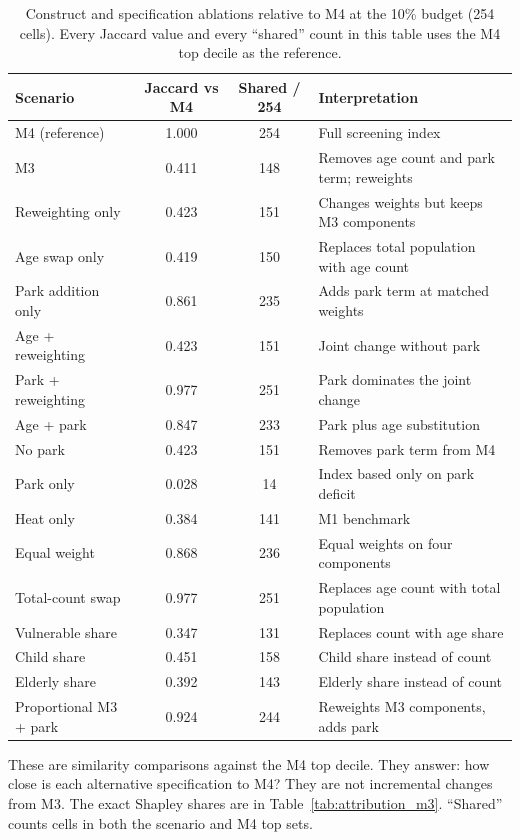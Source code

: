 \begin{table}[H]
\centering
\small
\caption{Construct and specification ablations relative to M4 at the 10\%
budget (254 cells). Every Jaccard value and every ``shared'' count in this table
uses the M4 top decile as the reference.}
\label{tab:attribution_m4}
\begin{threeparttable}
\begin{tabularx}{\textwidth}{@{}>{\raggedright\arraybackslash}p{6.0cm} c c >{\raggedright\arraybackslash}X@{}}
\toprule
Scenario & Jaccard vs M4 & Shared / 254 & Interpretation \\
\midrule
M4 (reference) & 1.000 & 254 & Full screening index \\
M3 & 0.411 & 148 & Removes age count and park term; reweights \\
Reweighting only & 0.423 & 151 & Changes weights but keeps M3 components \\
Age swap only & 0.419 & 150 & Replaces total population with age count \\
Park addition only & 0.861 & 235 & Adds park term at matched weights \\
Age + reweighting & 0.423 & 151 & Joint change without park \\
Park + reweighting & 0.977 & 251 & Park dominates the joint change \\
Age + park & 0.847 & 233 & Park plus age substitution \\
No park & 0.423 & 151 & Removes park term from M4 \\
Park only & 0.028 & 14 & Index based only on park deficit \\
Heat only & 0.384 & 141 & M1 benchmark \\
Equal weight & 0.868 & 236 & Equal weights on four components \\
Total-count swap & 0.977 & 251 & Replaces age count with total population \\
Vulnerable share & 0.347 & 131 & Replaces count with age share \\
Child share & 0.451 & 158 & Child share instead of count \\
Elderly share & 0.392 & 143 & Elderly share instead of count \\
Proportional M3 + park & 0.924 & 244 & Reweights M3 components, adds park \\
\bottomrule
\end{tabularx}
\begin{tablenotes}[flushleft]\footnotesize
\item These are similarity comparisons against the M4 top decile. They answer: how close is each alternative specification to M4? They are not incremental changes from M3. The exact Shapley shares are in Table~\ref{tab:attribution_m3}. ``Shared'' counts cells in both the scenario and M4 top sets.
\end{tablenotes}
\end{threeparttable}
\end{table}
